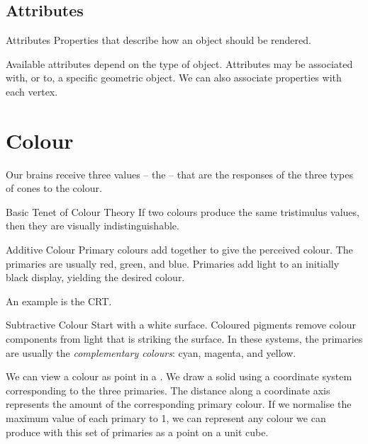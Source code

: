 \documentclass[../notes.tex]{subfiles}
\begin{document}
      \subsection{Attributes}
        \begin{definition}{Attributes}
          Properties that describe how an object should be rendered.
        \end{definition}

        Available attributes depend on the type of object.
        Attributes may be associated with, or  to, a specific geometric object.
        We can also associate properties with each vertex.

    \section{Colour}
      Our brains receive three values -- the  --
      that are the responses of the three types of cones to the colour.

      \begin{definition}{Basic Tenet of Colour Theory}
        If two colours produce the same tristimulus values,
        then they are visually indistinguishable.
      \end{definition}

      \begin{definition}{Additive Colour}
        Primary colours add together to give the perceived colour.
        The primaries are usually red, green, and blue.
        Primaries add light to an initially black display, yielding the desired colour.

        An example is the CRT.
      \end{definition}

      \begin{definition}{Subtractive Colour}
        Start with a white surface.
        Coloured pigments remove colour components from light that is striking the surface.
        In these systems, the primaries are usually the \emph{complementary colours}:
        cyan, magenta, and yellow.
      \end{definition}

      We can view a colour as point in a .
      We draw a solid using a coordinate system corresponding to the three primaries.
      The distance along a coordinate axis represents the amount of the corresponding
      primary colour.
      If we normalise the maximum value of each primary to 1,
      we can represent any colour we can produce with this set of primaries as a point
      on a unit cube.
\end{document}
